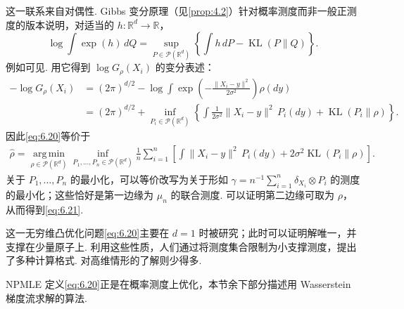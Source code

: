 这一联系来自对偶性. Gibbs 变分原理（见\autoref{prop:4.2}）针对概率测度而非一般正测度的版本说明，对适当的 $h:\mathbb R^d\to\mathbb R$，
$$
\log\int\exp(h)\,dQ
=\sup_{P\in\mathcal P(\mathbb R^d)}\left\{\int h\,dP-\operatorname{KL}(P\|Q)\right\}.
$$
例如可见\cite[命题 1.4.2]{ref125}. 用它得到 $\log G_\rho(X_i)$ 的变分表述：
$$
\begin{aligned}
-\log G_\rho(X_i)
&=(2\pi)^{d/2}-\log\int\exp\left(-\frac{\|X_i-y\|^2}{2\sigma^2}\right)\rho(dy)\\
&=(2\pi)^{d/2}+\inf_{P_i\in\mathcal P(\mathbb R^d)}
\left\{\int\frac1{2\sigma^2}\|X_i-y\|^2\,P_i(dy)+\operatorname{KL}(P_i\|\rho)\right\}.
\end{aligned}
$$
因此\eqref{eq:6.20}等价于
$$
\begin{aligned}
\widehat\rho=\operatorname*{arg\,min}_{\rho\in\mathcal P(\mathbb R^d)}
\inf_{P_1,\ldots,P_n\in\mathcal P(\mathbb R^d)}\frac1n\sum_{i=1}^n
\left[\int\|X_i-y\|^2\,P_i(dy)+2\sigma^2\operatorname{KL}(P_i\|\rho)\right].
\end{aligned}
$$
关于 $P_1,\ldots,P_n$ 的最小化，可以等价改写为关于形如 $\gamma=n^{-1}\sum_{i=1}^n\delta_{X_i}\otimes P_i$ 的测度的最小化；这些恰好是第一边缘为 $\mu_n$ 的联合测度. 可以证明第二边缘可取为 $\rho$，从而得到\eqref{eq:6.21}.

这一无穷维凸优化问题\eqref{eq:6.20}主要在 $d=1$ 时被研究；此时可以证明解唯一，并支撑在少量原子上\cite{ref211,ref260}. 利用这些性质，人们通过将测度集合限制为小支撑测度，提出了多种计算格式. 对高维情形的了解则少得多.

NPMLE 定义\eqref{eq:6.20}正是在概率测度上优化，本节余下部分描述用 Wasserstein 梯度流求解的算法.

